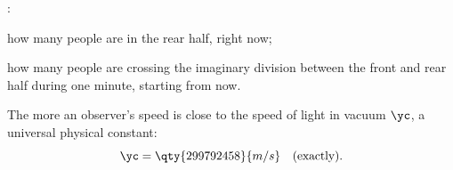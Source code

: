 %
%










:\enspace
\begin{enumerate*}[label=(\arabic*)]
\item how many people are in the rear half, right now;\enspace
\item how many people are crossing the imaginary division between the front and rear half during one minute, starting from now.
\end{enumerate*}



The more an observer's speed is close to the speed of light in vacuum $\yc$, a universal physical constant:
%
%
\begin{equation}
  \label{eq:c}
  \yc = \qty{299792458}{m/s}\quad\text{(exactly).}
\end{equation}







